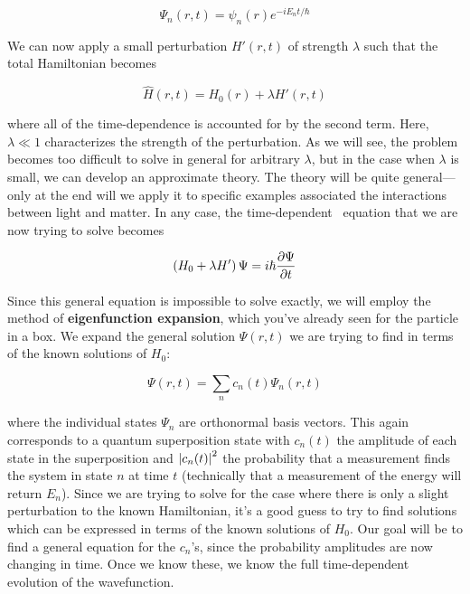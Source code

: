 \begin{equation*}
	\Psi_n(r,t) = \psi_n(r)e^{-iE_nt/\hbar}
\end{equation*}

We can now apply a small perturbation $H'(r,t)$ of strength $\lambda$ such that the total Hamiltonian becomes 

\begin{tcolorbox}[title = Hamiltonian for small perturbations] \vspace{-2ex}
	\begin{equation}
	\hat{H}(r,t) = H_0(r) + \lambda H'(r,t) \label{eq:ham-pert}
	\end{equation}	
\end{tcolorbox}
	
where all of the time-dependence is accounted for by the second term. 
Here, $\lambda \ll 1$ characterizes the strength of the perturbation. 
As we will see, the problem becomes too difficult to solve in general for arbitrary $\lambda$, but in the case when $\lambda$ is small, we can develop an approximate theory. 
The theory will be quite general---only at the end will we apply it to specific examples associated the interactions between light and matter. 
In any case, the time-dependent \Sch\ equation that we are now trying to solve becomes

\begin{equation}
	\left(H_0 + \lambda H'\right)\Psi = i\hbar \pdv{\Psi}{t} \label{eq:sch-pert}
\end{equation}

Since this general equation is impossible to solve exactly, we will employ the method of \textbf{eigenfunction expansion}, which you've already seen for the particle in a box. 
We expand the general solution $\Psi(r,t)$ we are trying to find in terms of the known solutions of $H_0$:

\begin{equation}
	\Psi(r,t) = \sum_n c_n(t) \Psi_n(r,t) \label{eq:exp-pert}
\end{equation}

\noindent where the individual states $\Psi_n$ are orthonormal basis vectors. 
This again corresponds to a quantum superposition state with $c_n(t)$ the amplitude of each state in the superposition and $\abs{c_n(t)}^2$ the probability that a measurement finds the system in state $n$ at time $t$ (technically that a measurement of the energy will return $E_n$). 
Since we are trying to solve for the case where there is only a slight perturbation to the known Hamiltonian, it's a good guess to try to find solutions which can be expressed in terms of the known solutions of $H_0$. 
Our goal will be to find a general equation for the $c_n$'s, since the probability amplitudes are now changing in time. 
Once we know these, we know the full time-dependent evolution of the wavefunction. 


